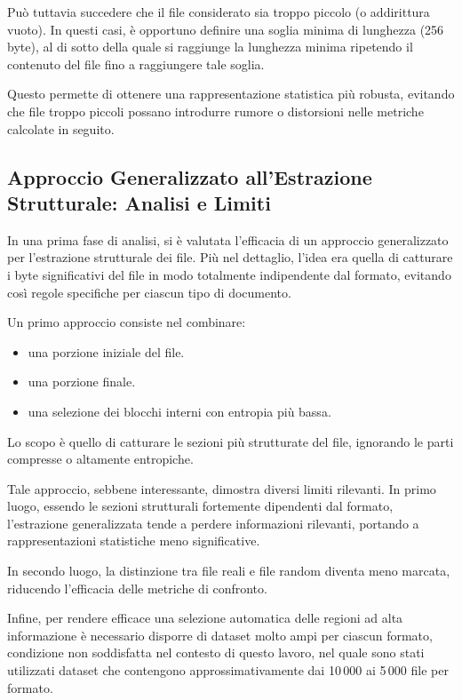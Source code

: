 \documentclass{report}
\begin{document}
\bigskip    

Può tuttavia succedere che il file considerato sia troppo piccolo (o addirittura vuoto).
In questi casi, è opportuno definire una soglia minima di lunghezza (256 byte), al di sotto della quale si raggiunge la lunghezza minima 
ripetendo il contenuto del file fino a raggiungere tale soglia.

\bigskip

Questo permette di ottenere una rappresentazione statistica più robusta, evitando che file troppo piccoli possano introdurre rumore o 
distorsioni nelle metriche calcolate in seguito.


\subsection{Approccio Generalizzato all’Estrazione Strutturale: Analisi e Limiti}

In una prima fase di analisi, si è valutata l’efficacia di un approccio generalizzato per l’estrazione strutturale dei file.
Più nel dettaglio, l'idea era quella di catturare i byte significativi del file in modo totalmente indipendente dal formato,
evitando così regole specifiche per ciascun tipo di documento.

Un primo approccio consiste nel combinare:
\begin{itemize}
    \item una porzione iniziale del file.
    \item una porzione finale.
    \item una selezione dei blocchi interni con entropia più bassa.
\end{itemize}

Lo scopo è quello di catturare le sezioni più strutturate del file, ignorando le parti compresse o altamente entropiche.

\bigskip

Tale approccio, sebbene interessante, dimostra diversi limiti rilevanti.
In primo luogo, essendo le sezioni strutturali fortemente dipendenti dal formato, l’estrazione generalizzata tende a perdere informazioni rilevanti,
portando a rappresentazioni statistiche meno significative.

\bigskip

In secondo luogo, la distinzione tra file reali e file random diventa meno marcata, riducendo l’efficacia delle metriche di confronto.

\bigskip

Infine, per rendere efficace una selezione automatica delle regioni ad alta informazione è necessario disporre di dataset molto ampi per ciascun formato,
condizione non soddisfatta nel contesto di questo lavoro, nel quale sono stati utilizzati dataset che contengono 
approssimativamente dai 10\,000 ai 5\,000 file per formato.
\end{document}
